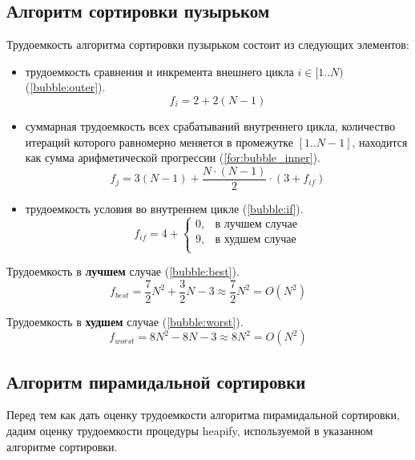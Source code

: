 \subsection{Алгоритм сортировки пузырьком}
Трудоемкость алгоритма сортировки пузырьком состоит из следующих элементов:
\begin{itemize}
	\item трудоемкость сравнения и инкремента внешнего цикла $i \in [1..N)$ (\ref{bubble:outer}).
	\begin{equation}
		\label{bubble:outer}
		f_{i} = 2 + 2(N - 1)
	\end{equation}
	\item суммарная трудоемкость всех срабатываний внутреннего цикла, количество итераций которого равномерно меняется в промежутке $[1..N-1]$, находится как сумма арифметической прогрессии (\ref{for:bubble_inner}).
	\begin{equation}
		\label{for:bubble_inner}
		f_{j} = 3(N - 1) + \frac{N\cdot(N - 1)}{2} \cdot (3 + f_{if})
	\end{equation}
	\item трудоемкость условия во внутреннем цикле (\ref{bubble:if}).
	\begin{equation}
		\label{bubble:if}
		f_{if} = 4 + \begin{cases}
			0, & \text{в лучшем случае}\\
			9, & \text{в худшем случае}\\
		\end{cases}
	\end{equation}
\end{itemize}

Трудоемкость в \textbf{лучшем} случае (\ref{bubble:best}).
\begin{equation}
	\label{bubble:best}
	f_{best} = \frac{7}{2} N^2 + \frac{3}{2} N - 3 \approx \frac{7}{2} N^2 = O(N^2)
\end{equation}

Трудоемкость в \textbf{худшем} случае (\ref{bubble:worst}).
\begin{equation}
	\label{bubble:worst}
	f_{worst} =  8N^2 - 8N - 3 \approx 8N^2 = O(N^2)
\end{equation}

\subsection{Алгоритм пирамидальной сортировки}
Перед тем как дать оценку трудоемкости алгоритма пирамидальной сортировки, дадим оценку трудоемкости процедуры heapify, используемой в указанном алгоритме сортировки.

